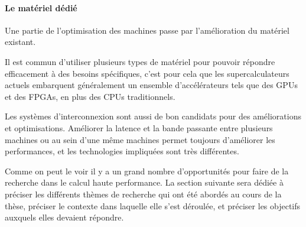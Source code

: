 \paragraph{Le matériel dédié}

Une partie de l'optimisation des machines passe par l'amélioration du matériel existant.

Il est commun d'utiliser plusieurs types de matériel pour pouvoir répondre efficacement à des besoins spécifiques, c'est pour cela que les supercalculateurs actuels embarquent généralement un ensemble d'accélérateurs tels que des GPUs et des FPGAs, en plus des CPUs traditionnels.

Les systèmes d'interconnexion sont aussi de bon candidats pour des améliorations et optimisations.
Améliorer la latence et la bande passante entre plusieurs machines ou au sein d'une même machines permet toujours d'améliorer les performances, et les technologies impliquées sont très différentes.



Comme on peut le voir il y a un grand nombre d'opportunités pour faire de la recherche dans le calcul haute performance.
La section suivante sera dédiée à préciser les différents thèmes de recherche qui ont été abordés au cours de la thèse, préciser le contexte dans laquelle elle s'est déroulée, et préciser les objectifs auxquels elles devaient répondre.





